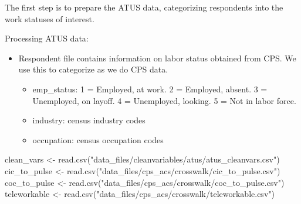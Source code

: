 \documentclass[
]{article}
\newenvironment{Shaded}{\begin{snugshade}}{\end{snugshade}}
\newcommand{\FunctionTok}[1]{\textcolor[rgb]{0.00,0.00,0.00}{#1}}
\newcommand{\NormalTok}[1]{#1}
\newcommand{\OtherTok}[1]{\textcolor[rgb]{0.56,0.35,0.01}{#1}}
\newcommand{\StringTok}[1]{\textcolor[rgb]{0.31,0.60,0.02}{#1}}
\providecommand{\tightlist}{%
  \setlength{\itemsep}{0pt}\setlength{\parskip}{0pt}}
\begin{document}
The first step is to prepare the ATUS data, categorizing respondents
into the work statuses of interest.

Processing ATUS data:

\begin{itemize}
\tightlist
\item
  Respondent file contains information on labor status obtained from
  CPS. We use this to categorize as we do CPS data.

  \begin{itemize}
  \tightlist
  \item
    emp\_status: 1 = Employed, at work. 2 = Employed, absent. 3 =
    Unemployed, on layoff. 4 = Unemployed, looking. 5 = Not in labor
    force.
  \item
    industry: census industry codes
  \item
    occupation: census occupation codes
  \end{itemize}
\end{itemize}

\begin{Shaded}
\begin{Highlighting}[]
\NormalTok{clean\_vars }\OtherTok{\textless{}{-}} \FunctionTok{read.csv}\NormalTok{(}\StringTok{"data\_files/cleanvariables/atus/atus\_cleanvars.csv"}\NormalTok{)}
\NormalTok{cic\_to\_pulse }\OtherTok{\textless{}{-}} \FunctionTok{read.csv}\NormalTok{(}\StringTok{"data\_files/cps\_acs/crosswalk/cic\_to\_pulse.csv"}\NormalTok{)}
\NormalTok{coc\_to\_pulse }\OtherTok{\textless{}{-}} \FunctionTok{read.csv}\NormalTok{(}\StringTok{"data\_files/cps\_acs/crosswalk/coc\_to\_pulse.csv"}\NormalTok{)}
\NormalTok{teleworkable }\OtherTok{\textless{}{-}} \FunctionTok{read.csv}\NormalTok{(}\StringTok{"data\_files/cps\_acs/crosswalk/teleworkable.csv"}\NormalTok{)}
\end{Highlighting}
\end{Shaded}
\end{document}
